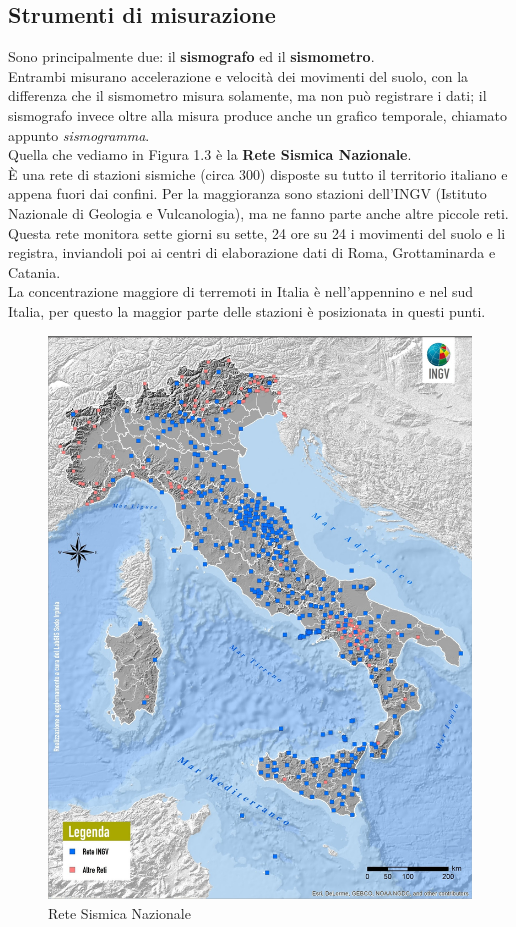 \documentclass[a4paper,10pt]{memoir}
\begin{document}
\subsection{Strumenti di misurazione}
Sono principalmente due: il \textbf{sismografo} ed il \textbf{sismometro}.
\\
Entrambi misurano accelerazione e velocità dei movimenti del suolo, con la differenza che il sismometro misura solamente, ma non può registrare i dati; il sismografo invece oltre alla misura produce anche un grafico temporale, chiamato appunto \textit{sismogramma}.
\\
Quella che vediamo in Figura 1.3 è la \textbf{Rete Sismica Nazionale}.
\\
È una rete di stazioni sismiche (circa 300) disposte su tutto il territorio italiano e appena fuori dai confini.
Per la maggioranza sono stazioni dell'INGV (Istituto Nazionale di Geologia e Vulcanologia), ma ne fanno parte anche altre piccole reti.
\\
Questa rete monitora sette giorni su sette, 24 ore su 24 i movimenti del suolo e li registra, inviandoli poi ai centri di elaborazione dati di Roma, Grottaminarda e Catania.
\\
La concentrazione maggiore di terremoti in Italia è nell'appennino e nel sud Italia, per questo la maggior parte delle stazioni è posizionata in questi punti.

\clearpage

\begin{figure}
\caption{Rete Sismica Nazionale}
\label{fig:RSN}
\includegraphics[width=1\textwidth]{Chapter-1/RSN.jpg}
\end{figure}
\end{document}
